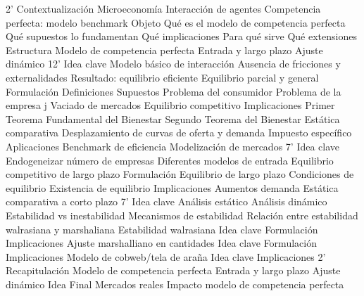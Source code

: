 \documentclass{nuevotema}
\begin{document}
\begin{esquema}[enumerate]
	\1[]  2'
		\2 Contextualización
			\3 Microeconomía
			\3 Interacción de agentes
			\3 Competencia perfecta: modelo benchmark
		\2 Objeto
			\3 Qué es el modelo de competencia perfecta
			\3 Qué supuestos lo fundamentan
			\3 Qué implicaciones
			\3 Para qué sirve
			\3 Qué extensiones
		\2 Estructura
			\3 Modelo de competencia perfecta
			\3 Entrada y largo plazo
			\3 Ajuste dinámico
	\1  12'
		\2 Idea clave
			\3 Modelo básico de interacción
			\3 Ausencia de fricciones y externalidades
			\3 Resultado: equilibrio eficiente
			\3 Equilibrio parcial y general
		\2 Formulación
			\3 Definiciones
			\3 Supuestos
			\3 Problema del consumidor
			\3 Problema de la empresa j
			\3 Vaciado de mercados
			\3 {Equilibrio competitivo}
		\2 Implicaciones
			\3 Primer Teorema Fundamental del Bienestar
			\3 {Segundo Teorema del Bienestar}
		\2 Estática comparativa
			\3 Desplazamiento de curvas de oferta y demanda
			\3 Impuesto específico
		\2 Aplicaciones
			\3 Benchmark de eficiencia
			\3 Modelización de mercados
	\1  7'
		\2 Idea clave
			\3 Endogeneizar número de empresas
			\3 Diferentes modelos de entrada
			\3 Equilibrio competitivo de largo plazo
		\2 Formulación
			\3 Equilibrio de largo plazo
			\3 Condiciones de equilibrio
			\3 Existencia de equilibrio
		\2 Implicaciones
			\3 Aumentos demanda
			\3 Estática comparativa a corto plazo
	\1  7'
		\2 Idea clave
			\3 Análisis estático
			\3 Análisis dinámico
			\3 Estabilidad vs inestabilidad
			\3 Mecanismos de estabilidad
			\3 Relación entre estabilidad walrasiana y marshaliana
		\2 Estabilidad walrasiana
			\3 Idea clave
			\3 Formulación
			\3 Implicaciones
		\2 Ajuste marshalliano en cantidades
			\3 Idea clave
			\3 Formulación
			\3 Implicaciones
		\2 Modelo de cobweb/tela de araña
			\3 Idea clave
			\3 Implicaciones
	\1[]  2'
		\2 Recapitulación
			\3 Modelo de competencia perfecta
			\3 Entrada y largo plazo
			\3 Ajuste dinámico
		\2 Idea Final
			\3 Mercados reales
			\3 Impacto modelo de competencia perfecta

\end{esquema}

\esquemalargo
\end{document}
